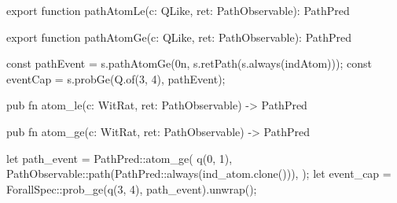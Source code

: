 \begin{tssrc}
export function pathAtomLe(c: QLike, ret: PathObservable): PathPred

export function pathAtomGe(c: QLike, ret: PathObservable): PathPred
\end{tssrc}
\begin{tssrc}
const pathEvent = s.pathAtomGe(0n, s.retPath(s.always(indAtom)));
const eventCap = s.probGe(Q.of(3, 4), pathEvent);
\end{tssrc}
\begin{rustsrc}
pub fn atom_le(c: WitRat, ret: PathObservable) -> PathPred

pub fn atom_ge(c: WitRat, ret: PathObservable) -> PathPred
\end{rustsrc}
\begin{rustsrc}
let path_event = PathPred::atom_ge(
    q(0, 1),
    PathObservable::path(PathPred::always(ind_atom.clone())),
);
let event_cap = ForallSpec::prob_ge(q(3, 4), path_event).unwrap();
\end{rustsrc}
